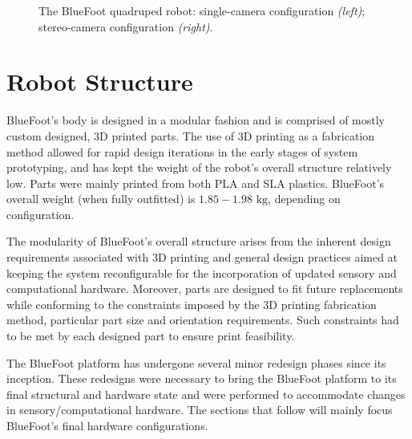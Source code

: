 		\begin{figure}[h!]
			\centering
			\caption{The BlueFoot quadruped robot: single-camera configuration \emph{(left)}; stereo-camera configuration \emph{(right)}.}
			\label{fig::bluefoot}
		\end{figure} 
	
	\section{Robot Structure}
	
		BlueFoot's body is designed in a modular fashion and is comprised of mostly custom designed, 3D printed parts. The use of 3D printing as a fabrication method allowed for rapid design iterations in the early stages of system prototyping, and has kept the weight of the robot's overall structure relatively low. Parts were mainly printed from both PLA and SLA plastics. BlueFoot's overall weight (when fully outfitted) is $1.85-1.98 \text{ kg}$, depending on configuration.

		The modularity of BlueFoot's overall structure arises from the inherent design requirements associated with 3D printing and general design practices aimed at keeping the system reconfigurable for the incorporation of updated sensory and computational hardware. Moreover, parts are designed to fit future replacements while conforming to the constraints imposed by the 3D printing fabrication method, \IE particular part size and orientation requirements. Such constraints had to be met by each designed part to ensure print feasibility. 

		The BlueFoot platform has undergone several minor redesign phases since its inception. These redesigns were necessary to bring the BlueFoot platform to its final structural and hardware state and were performed to accommodate changes in  sensory/computational hardware. The sections that follow will mainly focus BlueFoot's final hardware configurations.

